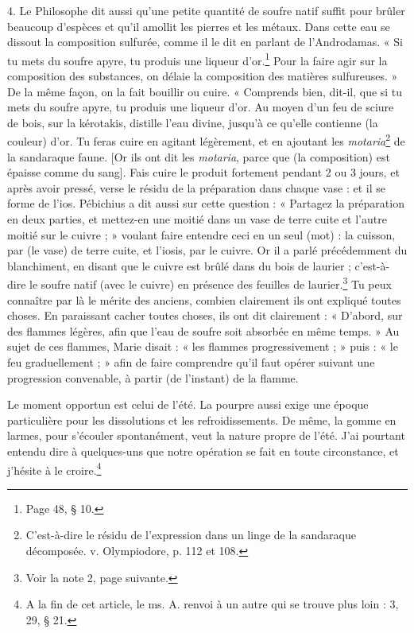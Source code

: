 \documentclass[a4paper, 11pt, oneside, polutonikogreek, french]{article}
\begin{document}
4. Le Philosophe dit aussi qu'une petite quantité de soufre natif suffit pour brûler beaucoup d'espèces et qu'il amollit les pierres et les métaux. Dans cette eau se dissout la composition sulfurée, comme il le dit en parlant de l'Androdamas. « Si tu mets du soufre apyre, tu produis une liqueur d'or.\footnote{Page 48, § 10.} Pour la faire agir sur la composition des substances, on délaie la composition des matières sulfureuses. » De la même façon, on la fait bouillir ou cuire. « Comprends bien, dit-il, que si tu mets du soufre apyre, tu produis une liqueur d'or. Au moyen d'un feu de sciure de bois, sur la kérotakis, distille l'eau divine, jusqu'à ce qu'elle contienne (la couleur) d'or. Tu feras cuire en agitant légèrement, et en ajoutant les \emph{motaria}\footnote{C'est-à-dire le résidu de l'expression dans un linge de la sandaraque décomposée. v. Olympiodore, p. 112 et 108.} de la sandaraque faune. [Or ils ont dit les \emph{motaria}, parce que (la composition) est épaisse comme du sang]. Fais cuire le produit fortement pendant 2 ou 3 jours, et après avoir pressé, verse le résidu de la préparation dans chaque vase : et il se forme de l'ios. Pébichius a dit aussi sur cette question : « Partagez la préparation en deux parties, et mettez-en une moitié dans un vase de terre cuite et l'autre moitié sur le cuivre ; » voulant faire entendre ceci en un seul (mot) : la cuisson, par (le vase) de terre cuite, et l'iosis, par le cuivre. Or il a parlé précédemment du blanchiment, en disant que le cuivre est brûlé dans du bois de laurier ; c'est-à-dire le soufre natif (avec le cuivre) en présence des feuilles de laurier.\footnote{Voir la note 2, page suivante.} Tu peux connaître par là le mérite des anciens, combien clairement ils ont expliqué toutes choses. En paraissant cacher toutes choses, ils ont dit clairement : « D'abord, sur des flammes légères, afin que l'eau de soufre soit absorbée en même temps. » Au sujet de ces flammes, Marie disait : « les flammes progressivement ; » puis : « le feu graduellement ; » afin de faire comprendre qu'il faut opérer suivant une progression convenable, à partir (de l'instant) de la flamme.

Le moment opportun est celui de l'été. La pourpre aussi exige une époque particulière pour les dissolutions et les refroidissements. De même, la gomme en larmes, pour s'écouler spontanément, veut la nature propre de l'été. J'ai pourtant entendu dire à quelques-uns que notre opération se fait en toute circonstance, et j'hésite à le croire.\footnote{A la fin de cet article, le ms. A. renvoi à un autre qui se trouve plus loin : 3, 29, § 21.}
\end{document}
